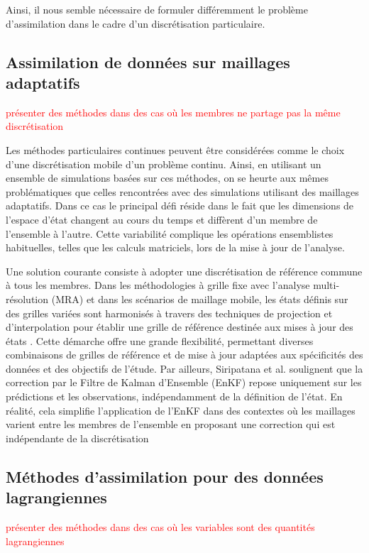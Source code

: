 Ainsi, il nous semble nécessaire de formuler différemment le problème d'assimilation dans le cadre d'un discrétisation particulaire.

\subsection{Assimilation de données sur maillages adaptatifs}

\textcolor{red}{présenter des méthodes dans des cas où les membres ne partage pas la même discrétisation}

Les méthodes particulaires continues peuvent être considérées comme le choix d'une discrétisation mobile d'un problème continu. Ainsi, en utilisant un ensemble de simulations basées sur ces méthodes, on se heurte aux mêmes problématiques que celles rencontrées avec des simulations utilisant des maillages adaptatifs.
Dans ce cas le principal défi réside dans le fait que les dimensions de l'espace d'état changent au cours du temps et diffèrent d'un membre de l'ensemble à l'autre. Cette variabilité complique les opérations ensemblistes habituelles, telles que les calculs matriciels, lors de la mise à jour de l'analyse.

Une solution courante consiste à adopter une discrétisation de référence commune à tous les membres. Dans les méthodologies à grille fixe avec l'analyse multi-résolution (MRA) et dans les scénarios de maillage mobile, les états définis sur des grilles variées sont harmonisés à travers des techniques de projection et d'interpolation pour établir une grille de référence destinée aux mises à jour des états \cite{siripatana_combining_2019, bonan_data_2017}. Cette démarche offre une grande flexibilité, permettant diverses combinaisons de grilles de référence et de mise à jour adaptées aux spécificités des données et des objectifs de l'étude. Par ailleurs, Siripatana et al. \cite{siripatana_combining_2019} soulignent que la correction par le Filtre de Kalman d’Ensemble (EnKF) repose uniquement sur les prédictions et les observations, indépendamment de la définition de l'état. En réalité, cela simplifie l'application de l'EnKF dans des contextes où les maillages varient entre les membres de l'ensemble en proposant une correction qui est indépendante de la discrétisation

\subsection{Méthodes d'assimilation pour des données lagrangiennes}
\textcolor{red}{présenter des méthodes dans des cas où les variables sont des quantités lagrangiennes}


